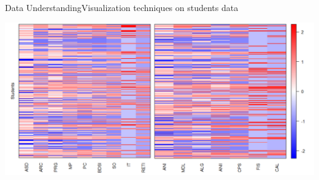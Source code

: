 \begin{frame}{Data Understanding}{Visualization techniques on students data}

    \vspace{0.5cm}
    \hspace*{-0.8cm}\includegraphics[scale=0.275]{img4.png}

\end{frame}